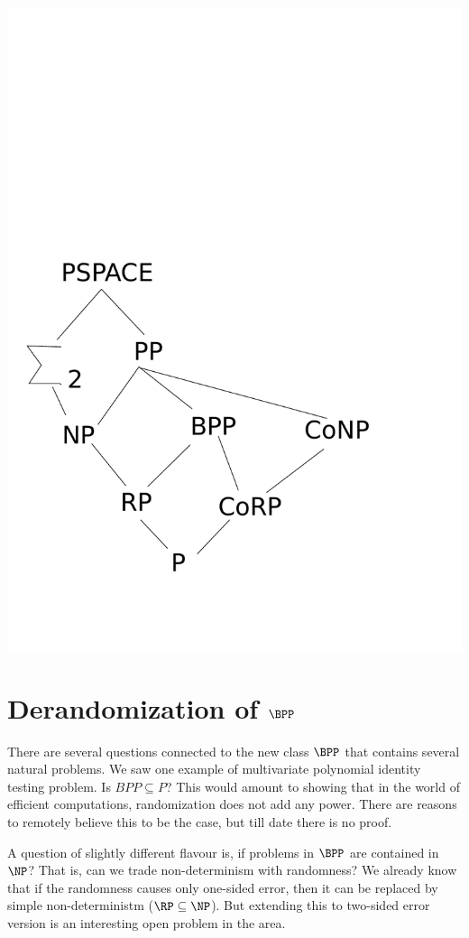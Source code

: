 \begin{center}
\includegraphics[scale=0.3]{hie3}
\end{center}
\vspace{-10mm}

\section{Derandomization of $\BPP$}
There are several questions connected to the new class $\BPP$ that contains several natural problems. We saw one example of multivariate polynomial identity testing problem. Is $BPP \subseteq P$? This would amount to showing that in the world of efficient computations, randomization does not add any power. There are reasons to remotely believe this to be the case, but till date there is no proof. 

A question of slightly different flavour is, if problems in $\BPP$ are contained in $\NP$? That is, can we trade non-determinism with randomness? We already know that if the randomness causes only one-sided error, then it can be replaced by simple non-deterministm ($\RP \subseteq \NP$). But extending this to two-sided error version is an interesting open problem in the area. 

